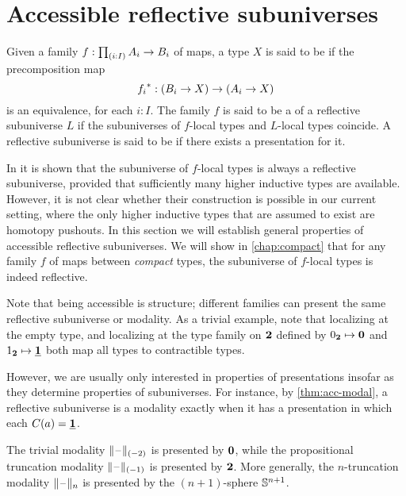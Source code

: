\section{Accessible reflective subuniverses}\label{sec:accessible}

\begin{defn}
Given a family $f:\prd{i:I}A_i\to B_i$ of maps, a type $X$ is said to be  if the precomposition map
\begin{equation*}
{f_i}^\ast:(B_i\to X)\to (A_i\to X)
\end{equation*}
is an equivalence, for each $i:I$. The family $f$ is said to be a  of a reflective subuniverse $L$ if the subuniverses of $f$-local types and $L$-local types coincide. A reflective subuniverse is said to be  if there exists a presentation for it. 
\end{defn}

In \cite{RijkeShulmanSpitters} it is shown that the subuniverse of $f$-local types is always a reflective subuniverse, provided that sufficiently many higher inductive types are available. However, it is not clear whether their construction is possible in our current setting, where the only higher inductive types that are assumed to exist are homotopy pushouts. In this section we will establish general properties of accessible reflective subuniverses. We will show in \cref{chap:compact} that for any family $f$ of maps between \emph{compact} types, the subuniverse of $f$-local types is indeed reflective. 

\begin{rmk}
Note that being accessible is structure; different families can present the same reflective subuniverse or modality.
As a trivial example, note that localizing at the empty
type, and localizing at the type family on $\mathbf{2}$ defined by
${0_{\mathbf{2}}}\mapsto \mathbf{0}$ and ${1_{\mathbf{2}}}\mapsto \underline{\mathbf{1}}$ both map all types to contractible types.

However, we are usually only interested in properties of presentations insofar as they determine properties of subuniverses.
For instance, by \cref{thm:acc-modal}, a reflective subuniverse is a modality exactly when it has a presentation in which each $C(a)=\underline{\mathbf{1}}$.
\end{rmk}

\begin{eg}\label{thm:trunc-acc}
The trivial modality $\Vert \mathord{\hspace{1pt}\text{--}\hspace{1pt}} \Vert_{(-2)}$ is presented by $\mathbf{0}$, while the propositional truncation modality $\Vert \mathord{\hspace{1pt}\text{--}\hspace{1pt}} \Vert_{(-1)}$ is presented by $\mathbf{2}$.  More generally, the
$n$-truncation modality $\Vert \mathord{\hspace{1pt}\text{--}\hspace{1pt}} \Vert_{n}$ is presented by the $(n+1)$-sphere $\mathbb{S}^{n+1}$.
\end{eg}

